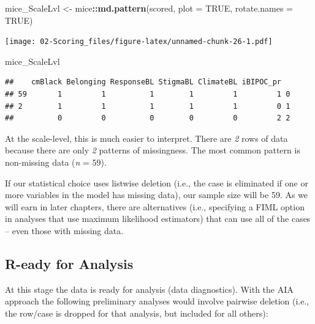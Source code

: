 \documentclass[
  11pt,
]{book}
\newenvironment{Shaded}{\begin{snugshade}}{\end{snugshade}}
\newcommand{\AttributeTok}[1]{\textcolor[rgb]{0.27,0.27,0.27}{#1}}
\newcommand{\ConstantTok}[1]{\textcolor[rgb]{0.37,0.37,0.37}{#1}}
\newcommand{\FunctionTok}[1]{\textcolor[rgb]{0.27,0.27,0.27}{\textbf{#1}}}
\newcommand{\NormalTok}[1]{#1}
\newcommand{\OtherTok}[1]{\textcolor[rgb]{0.37,0.37,0.37}{#1}}
\newcommand{\SpecialCharTok}[1]{\textcolor[rgb]{0.43,0.43,0.43}{\textbf{#1}}}
\begin{document}
\begin{Shaded}
\begin{Highlighting}[]
\NormalTok{mice\_ScaleLvl }\OtherTok{\textless{}{-}}\NormalTok{ mice}\SpecialCharTok{::}\FunctionTok{md.pattern}\NormalTok{(scored, }\AttributeTok{plot =} \ConstantTok{TRUE}\NormalTok{, }\AttributeTok{rotate.names =} \ConstantTok{TRUE}\NormalTok{)}
\end{Highlighting}
\end{Shaded}

\texttt{[image: 02-Scoring\_files/figure-latex/unnamed-chunk-26-1.pdf]}

\begin{Shaded}
\begin{Highlighting}[]
\NormalTok{mice\_ScaleLvl}
\end{Highlighting}
\end{Shaded}

\begin{verbatim}
##    cmBlack Belonging ResponseBL StigmaBL ClimateBL iBIPOC_pr  
## 59       1         1          1        1         1         1 0
## 2        1         1          1        1         1         0 1
##          0         0          0        0         0         2 2
\end{verbatim}

At the scale-level, this is much easier to interpret. There are \emph{2} rows of data because there are only \emph{2} patterns of missingness. The most common pattern is non-missing data (\emph{n} = 59).

If our statistical choice uses listwise deletion (i.e., the case is eliminated if one or more variables in the model has missing data), our sample size will be 59. As we will earn in later chapters, there are alternatives (i.e., specifying a FIML option in analyses that use maximum likelihood estimators) that can use all of the cases -- even those with missing data.

\hypertarget{r-eady-for-analysis}{%
\subsection{R-eady for Analysis}\label{r-eady-for-analysis}}

At this stage the data is ready for analysis (data diagnostics). With the AIA approach \citep{parent_handling_2013} the following preliminary analyses would involve pairwise deletion (i.e., the row/case is dropped for that analysis, but included for all others):
\end{document}
